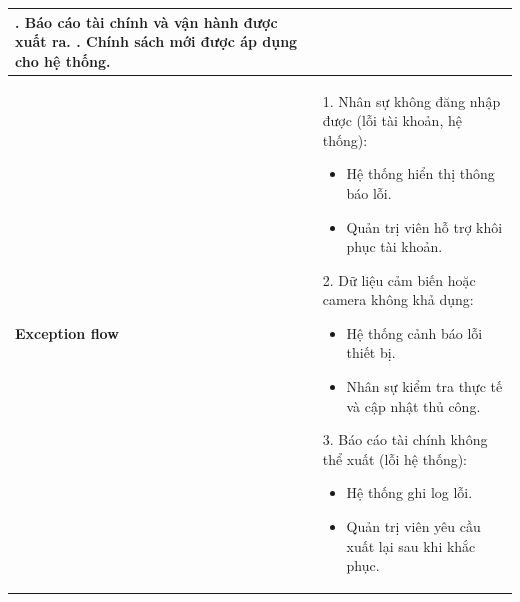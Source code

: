 \begin{longtable}{|>{\centering\arraybackslash}m{3cm}|m{13.7cm}|}
2. Báo cáo tài chính và vận hành được xuất ra. \newline
3. Chính sách mới được áp dụng cho hệ thống. \\ \hline
\textbf{Exception flow} & 
1. Nhân sự không đăng nhập được (lỗi tài khoản, hệ thống): 
\begin{itemize}
    \item Hệ thống hiển thị thông báo lỗi.
    \item Quản trị viên hỗ trợ khôi phục tài khoản.
\end{itemize}
2. Dữ liệu cảm biến hoặc camera không khả dụng:
\begin{itemize}
    \item Hệ thống cảnh báo lỗi thiết bị.
    \item Nhân sự kiểm tra thực tế và cập nhật thủ công.
\end{itemize}
3. Báo cáo tài chính không thể xuất (lỗi hệ thống):
\begin{itemize}
    \item Hệ thống ghi log lỗi.
    \item Quản trị viên yêu cầu xuất lại sau khi khắc phục.
\end{itemize}
\\ \hline
\end{longtable}
\endgroup

